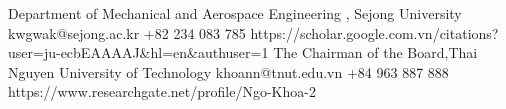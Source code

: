 \documentclass{simplecv}
\begin{document}
%
%
%






          {Department of Mechanical and Aerospace Engineering
           , Sejong University}
          {kwgwak@sejong.ac.kr}
          {+82 234 083 785}
          {https://scholar.google.com.vn/citations?user=ju-ecbEAAAAJ&hl=en&authuser=1}
{The Chairman of the Board,Thai Nguyen University of Technology}
{khoann@tnut.edu.vn}
{+84 963 887 888}
{https://www.researchgate.net/profile/Ngo-Khoa-2}
          
\end{document}
